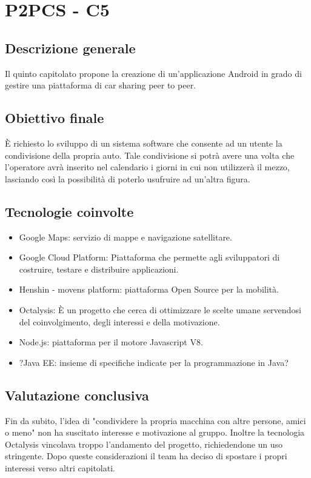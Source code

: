 \section{P2PCS - C5} \label{c5}
    \subsection{Descrizione generale}
    Il quinto capitolato propone la creazione di un'applicazione Android in grado di gestire una piattaforma di car sharing peer to peer.

    \subsection{Obiettivo finale}
    È richiesto lo sviluppo di un sistema software che consente ad un utente la condivisione della propria auto. Tale condivisione si potrà avere una volta che l'operatore avrà inserito nel calendario i giorni in cui non utilizzerà il mezzo, lasciando così la possibilità di poterlo usufruire ad un'altra figura.

    \subsection{Tecnologie coinvolte}
    	\begin{itemize}
    		\item Google Maps: servizio di mappe e navigazione satellitare.
		\item Google Cloud Platform: Piattaforma che permette agli sviluppatori di costruire, testare e distribuire applicazioni.
		\item Henshin - movens platform: piattaforma Open Source per la mobilità.
		\item Octalysis: È un progetto che cerca di ottimizzare le scelte umane servendosi del coinvolgimento, degli interessi e della motivazione.
		\item Node.js: piattaforma per il motore Javascript V8.
		\item ?Java EE: insieme di specifiche indicate per la programmazione in Java?
	\end{itemize}
	
    \subsection{Valutazione conclusiva}
    Fin da subito, l'idea di "condividere la propria macchina con altre persone, amici o meno" non ha suscitato interesse e motivazione al gruppo. Inoltre la tecnologia Octalysis vincolava troppo l'andamento del progetto, richiedendone un uso stringente. Dopo queste considerazioni il team ha deciso di spostare i propri interessi verso altri capitolati.
